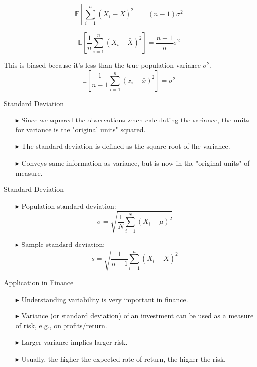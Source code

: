 \documentclass[12pt]{beamer}
\begin{document}
\begin{frame}	
	\[\mathbb E[\sum_{i=1}^n (X_i - \bar{X})^2] = (n-1)\sigma^2\]
	
	\[\mathbb E[\frac{1}{n}\sum_{i=1}^n (X_i - \bar{X})^2] = \frac{n-1}{n}\sigma^2\]
	
	This is biased because it's less than the true population variance $\sigma^2$.\medskip\\
	\[\mathbb E[\frac{1}{n-1}\sum_{i=1}^n (x_i - \bar{x})^2] = \sigma^2\]
	
\end{frame}
\begin{frame}{Standard Deviation}
\begin{itemize}
	\item[$\blacktriangleright$]Since we squared the observations when calculating the variance, the units for variance is the "original units" squared.
	\item[$\blacktriangleright$] The standard deviation is defined as the square-root of the variance.
	\item[$\blacktriangleright$] Conveys same information as variance, but is now in the "original units" of measure.
\end{itemize}
\end{frame}
\begin{frame}{Standard Deviation}
	\begin{itemize}
		\item[$\blacktriangleright$]Population standard deviation:
		$$\sigma=\sqrt{\frac{1}{N}\sum_{i=1}^N(X_i-\mu)^2}$$
		\item[$\blacktriangleright$]Sample standard deviation:
		$$s=\sqrt{\frac{1}{n-1}\sum_{i=1}^n(X_i-\bar{X})^2}$$
	\end{itemize}
\end{frame}
\begin{frame}{Application in Finance}
\begin{itemize}
		\item[$\blacktriangleright$] Understanding variability is very important in finance.
		\item[$\blacktriangleright$] Variance (or standard deviation) of an investment can be used as a measure of risk, e.g., on profits/return.
		\item[$\blacktriangleright$] Larger variance implies larger risk.
		\item[$\blacktriangleright$] Usually, the higher the expected rate of return, the higher the risk.
\end{itemize}
\end{frame}
\end{document}
